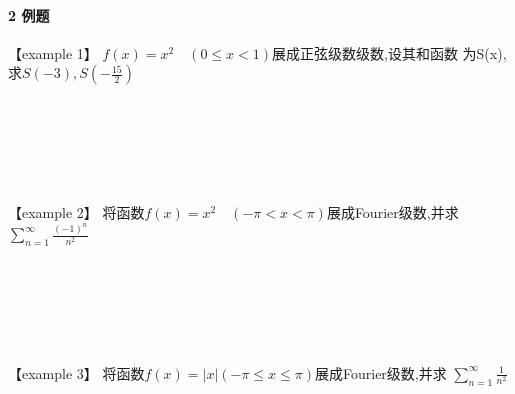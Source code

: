 \documentclass[12pt]{scrartcl}
\begin{document}
{\paragraph*{\large 2 例题}\leavevmode \newline
【example 1】 $f(x)=x^2\quad (0\leq x<1)$展成正弦级数级数,设其和函数
为S(x),求$S(-3),S(-\frac{15}{2} )$\\
\\
\\
\\
\\
\\
\\
【example 2】 将函数$f(x)=x^2\quad (-\pi<x<\pi)$展成Fourier级数,并求
$\sum_{n = 1}^{\infty} \frac{(-1)^n}{n^2}$  \\
\\
\\
\\
\\
\\
\\
【example 3】 将函数$f(x)=\left\lvert x\right\rvert  (-\pi\leq x\leq \pi)$展成Fourier级数,并求
$\sum_{n = 1}^{\infty} \frac{1}{n^2}$  \\
\\
\\
\\
\\
\\
\\
}
\end{document}
